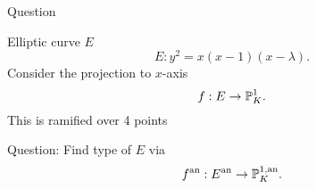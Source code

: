 \begin{frame}{Question}
	\begin{minipage}[t]{.7\textwidth}
	Elliptic curve $E$	
	\[
		E: y^2 = x(x-1)(x-\lambda)
	.\] 
	Consider the projection to $x$-axis 
	\[
	f: E \to \mathbb P^{1}_K
	.\] 
	This is ramified over 4 points 
	\end{minipage}
	\begin{minipage}[t]{.29\textwidth}
	\end{minipage}


	Question: 
	Find type of $E$ via \[
	f{}^{\text{an}} : E{}^{\text{an}} \to \mathbb P^{1, \text{an}}_K
	.\] 

\end{frame}
